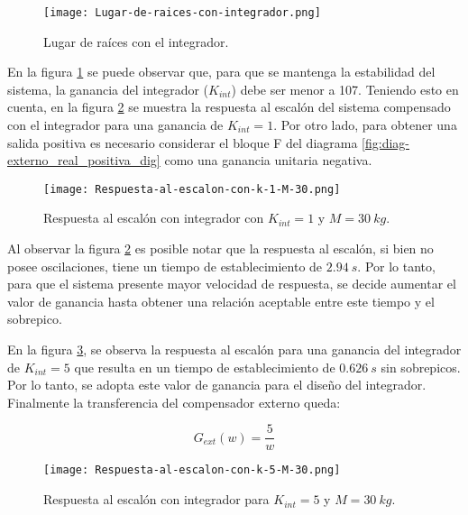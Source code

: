 \begin{figure}[H]
	\centering
	\texttt{[image: Lugar-de-raices-con-integrador.png]}
	\caption{Lugar de raíces con el integrador.}
	\label{fig:lugar-de-raices-con-integrador}
\end{figure}

\noindent En la figura \ref{fig:lugar-de-raices-con-integrador} se puede observar que, para que se mantenga la estabilidad del sistema, la ganancia del integrador ($K_{int}$) debe ser menor a 107. Teniendo esto en cuenta, en la figura \ref{fig:respuesta-al-escalon-con-k-1-M-30} se muestra la respuesta al escalón del sistema compensado con el integrador para una ganancia de $K_{int}=1$. Por otro lado, para obtener una salida positiva es necesario considerar el bloque F del diagrama \ref{fig:diag-externo_real_positiva_dig} como una ganancia unitaria negativa.


\begin{figure}[H]
	\centering
	\texttt{[image: Respuesta-al-escalon-con-k-1-M-30.png]}
	\caption{Respuesta al escalón con integrador con $K_{int} =1$ y $M=30\:kg$.}
	\label{fig:respuesta-al-escalon-con-k-1-M-30}
\end{figure}


Al observar la figura \ref{fig:respuesta-al-escalon-con-k-1-M-30} es posible notar que la respuesta al escalón, si bien no posee oscilaciones, tiene un tiempo de establecimiento de  $2.94\:s$. Por lo tanto, para que el sistema presente mayor velocidad de respuesta, se decide aumentar el valor de ganancia hasta obtener una relación aceptable entre este tiempo y el sobrepico.

En la figura \ref{fig:respuesta-al-escalon-con-k-5-M-30}, se observa la respuesta al escalón para una ganancia del integrador de $K_{int}=5$ que resulta en un tiempo de establecimiento de $0.626\:s$ sin sobrepicos. Por lo tanto, se adopta este valor de ganancia para el diseño del integrador. Finalmente la transferencia del compensador externo queda:

\begin{equation} \label{eq_gexterno_dig}
	G_{ext}(w)=\frac{5}{w}	
\end{equation}

\begin{figure}[H]
	\centering
	\texttt{[image: Respuesta-al-escalon-con-k-5-M-30.png]}
	\caption{Respuesta al escalón con integrador para $K_{int} =5$ y $M = 30\:kg$.}
	\label{fig:respuesta-al-escalon-con-k-5-M-30}
\end{figure}



